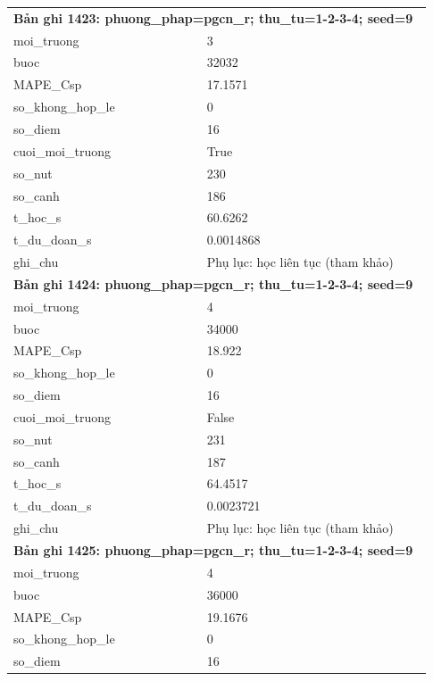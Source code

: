 \begin{longtable}{p{0.43\linewidth}p{0.50\linewidth}}
\midrule
\multicolumn{2}{p{0.95\linewidth}}{\textbf{Bản ghi 1423: phuong\_phap=pgcn\_r; thu\_tu=1-2-3-4; seed=9}} \\
moi\_\allowbreak truong & 3 \\
buoc & 32032 \\
MAPE\_\allowbreak Csp & 17.1571 \\
so\_\allowbreak khong\_\allowbreak hop\_\allowbreak le & 0 \\
so\_\allowbreak diem & 16 \\
cuoi\_\allowbreak moi\_\allowbreak truong & True \\
so\_\allowbreak nut & 230 \\
so\_\allowbreak canh & 186 \\
t\_\allowbreak hoc\_\allowbreak s & 60.6262 \\
t\_\allowbreak du\_\allowbreak doan\_\allowbreak s & 0.0014868 \\
ghi\_\allowbreak chu & Phụ lục: học liên tục (tham khảo) \\
\midrule
\multicolumn{2}{p{0.95\linewidth}}{\textbf{Bản ghi 1424: phuong\_phap=pgcn\_r; thu\_tu=1-2-3-4; seed=9}} \\
moi\_\allowbreak truong & 4 \\
buoc & 34000 \\
MAPE\_\allowbreak Csp & 18.922 \\
so\_\allowbreak khong\_\allowbreak hop\_\allowbreak le & 0 \\
so\_\allowbreak diem & 16 \\
cuoi\_\allowbreak moi\_\allowbreak truong & False \\
so\_\allowbreak nut & 231 \\
so\_\allowbreak canh & 187 \\
t\_\allowbreak hoc\_\allowbreak s & 64.4517 \\
t\_\allowbreak du\_\allowbreak doan\_\allowbreak s & 0.0023721 \\
ghi\_\allowbreak chu & Phụ lục: học liên tục (tham khảo) \\
\midrule
\multicolumn{2}{p{0.95\linewidth}}{\textbf{Bản ghi 1425: phuong\_phap=pgcn\_r; thu\_tu=1-2-3-4; seed=9}} \\
moi\_\allowbreak truong & 4 \\
buoc & 36000 \\
MAPE\_\allowbreak Csp & 19.1676 \\
so\_\allowbreak khong\_\allowbreak hop\_\allowbreak le & 0 \\
so\_\allowbreak diem & 16 \\

\end{longtable}
